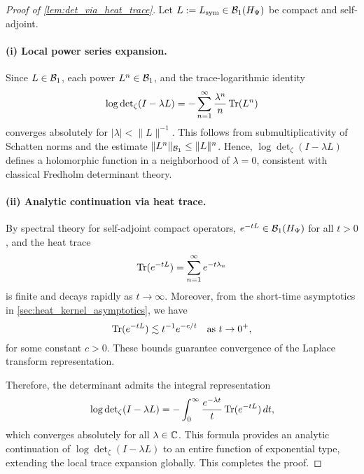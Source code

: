 \begin{proof}[Proof of \cref{lem:det_via_heat_trace}]
Let \( L := L_{\mathrm{sym}} \in \mathcal{B}_1(H_{\Psi}) \) be compact and self-adjoint.

\paragraph{(i) Local power series expansion.}
Since \( L \in \mathcal{B}_1 \), each power \( L^n \in \mathcal{B}_1 \), and the trace-logarithmic identity
\[
\log \det\nolimits_\zeta(I - \lambda L)
= - \sum_{n=1}^\infty \frac{\lambda^n}{n} \operatorname{Tr}(L^n)
\]
converges absolutely for \( |\lambda| < \|L\|^{-1} \). This follows from submultiplicativity of Schatten norms and the estimate \( \|L^n\|_{\mathcal{B}_1} \le \|L\|^n \). Hence, \( \log \det\nolimits_\zeta(I - \lambda L) \) defines a holomorphic function in a neighborhood of \( \lambda = 0 \), consistent with classical Fredholm determinant theory.

\paragraph{(ii) Analytic continuation via heat trace.}
By spectral theory for self-adjoint compact operators, \( e^{-tL} \in \mathcal{B}_1(H_{\Psi}) \) for all \( t > 0 \), and the heat trace
\[
\operatorname{Tr}(e^{-tL}) = \sum_{n=1}^\infty e^{-t\lambda_n}
\]
is finite and decays rapidly as \( t \to \infty \). Moreover, from the short-time asymptotics in \cref{sec:heat_kernel_asymptotics}, we have
\[
\operatorname{Tr}(e^{-tL}) \lesssim t^{-1} e^{-c/t} \quad \text{as } t \to 0^+,
\]
for some constant \( c > 0 \). These bounds guarantee convergence of the Laplace transform representation.

\medskip
\noindent
Therefore, the determinant admits the integral representation
\[
\log \det\nolimits_\zeta(I - \lambda L)
= - \int_0^\infty \frac{e^{-\lambda t}}{t} \operatorname{Tr}(e^{-tL}) \, dt,
\]
which converges absolutely for all \( \lambda \in \mathbb{C} \). This formula provides an analytic continuation of \( \log \det\nolimits_\zeta(I - \lambda L) \) to an entire function of exponential type, extending the local trace expansion globally. This completes the proof.
\end{proof}
